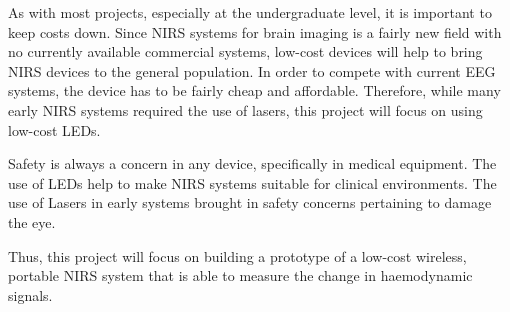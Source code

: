 As with most projects, especially at the undergraduate level, it is important to keep costs down. Since NIRS systems for brain imaging is a fairly new field with no currently available commercial systems, low-cost devices will help to bring NIRS devices to the general population. In order to compete with current EEG systems, the device has to be fairly cheap and affordable. Therefore, while many early NIRS systems required the use of lasers, this project will focus on using low-cost LEDs.

Safety is always a concern in any device, specifically in medical equipment. The use of LEDs help to make NIRS systems suitable for clinical environments. The use of Lasers in early systems brought in safety concerns pertaining to damage the eye.

Thus, this project will focus on building a prototype of a low-cost wireless, portable NIRS system that is able to measure the change in haemodynamic signals.
